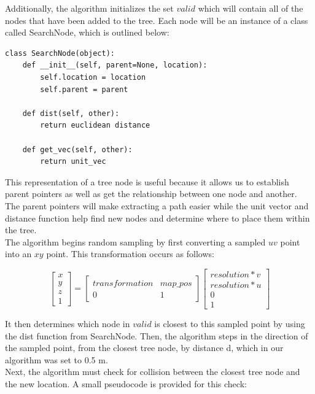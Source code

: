 \documentclass{article}
\begin{document}
Additionally, the algorithm initializes the set $valid$ which will contain all of the nodes that have been added to the tree. Each node will be an instance of a class called SearchNode, which is outlined below:

\begin{lstlisting}
class SearchNode(object):
    def __init__(self, parent=None, location):
        self.location = location
        self.parent = parent
    
    def dist(self, other):
        return euclidean distance
      
    def get_vec(self, other):
        return unit_vec
\end{lstlisting}

This representation of a tree node is useful because it allows us to establish parent pointers as well as get the relationship between one node and another. The parent pointers will make extracting a path easier while the unit vector and distance function help find new nodes and determine where to place them within the tree.\\

The algorithm begins random sampling by first converting a sampled $uv$ point into an $xy$ point. This transformation occurs as follows:

\begin{equation}
    \begin{bmatrix}x \\ y \\ z \\ 1 \end{bmatrix} = \begin{bmatrix} transformation & map\_pos \\ 0 & 1 \end{bmatrix}\begin{bmatrix} resolution*v \\ resolution*u \\ 0 \\ 1 \end{bmatrix}
\end{equation}

It then determines which node in $valid$ is closest to this sampled point by using the dist function from SearchNode. Then, the algorithm steps in the direction of the sampled point, from the closest tree node, by distance d, which in our algorithm was set to 0.5 {m}.\\

Next, the algorithm must check for collision between the closest tree node and the new location. A small pseudocode is provided for this check:
\end{document}
